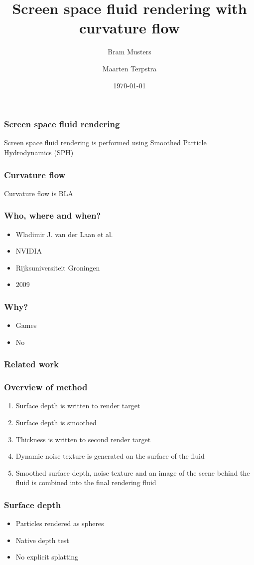 \documentclass{beamer}
\title[Fluid rendering with curvature flow] %
{Screen space fluid rendering with curvature flow}
\author[Musters, Terpstra] %
{Bram Musters \and Maarten Terpstra}
\date{\today}
\begin{document}
	\frame{\titlepage}
	\begin{frame}[t]\frametitle{Screen space fluid rendering}
		Screen space fluid rendering is performed using Smoothed Particle Hydrodynamics (SPH) 
	\end{frame}
	\begin{frame}[t]\frametitle{Curvature flow}
		Curvature flow is BLA
	\end{frame}
	\begin{frame}[t]\frametitle{Who, where and when?}
	    \begin{itemize}
	    	\item Wladimir J. van der Laan et al.
	    	\item NVIDIA 
	    	\item Rijksuniversiteit Groningen
	    	\item 2009
	    \end{itemize}
	\end{frame}
	\begin{frame}[t]\frametitle{Why?}
		\begin{itemize}
			\item Games
			\item No
		\end{itemize}
	\end{frame}
	\begin{frame}[t]\frametitle{Related work}
			
	\end{frame}
	\begin{frame}[t]\frametitle{Overview of method}
	    \begin{enumerate}
	    	\item Surface depth is written to render target
	    	\item Surface depth is smoothed
	    	\item Thickness is written to second render target
	    	\item Dynamic noise texture is generated on the surface of the fluid
	    	\item Smoothed surface depth, noise texture and an image of the scene behind the fluid is combined into the final rendering fluid 
	    \end{enumerate}	
	\end{frame}
	\begin{frame}[t]\frametitle{Surface depth}
		\begin{itemize}
			\item Particles rendered as spheres
			\item Native depth test
			\item No explicit splatting
		\end{itemize}	
	\end{frame}
\end{document}
